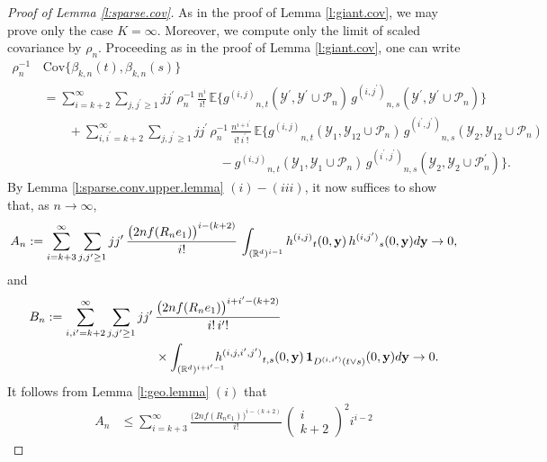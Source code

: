\documentclass[11pt]{amsart}
\numberwithin{equation}{section}
\theoremstyle{plain}
\theoremstyle{definition}
\begin{document}
\begin{proof}[Proof of Lemma \ref{l:sparse.cov}]
As in the proof of Lemma \ref{l:giant.cov}, we may prove only the case $K=\infty$. Moreover, we compute only the limit of scaled covariance by $\rho_n$. Proceeding as in the proof of Lemma \ref{l:giant.cov}, one can write
\begin{align*}
\rho_n^{-1}\, &\text{Cov} \bigl\{ \beta_{k,n}(t), \beta_{k,n}(s) \bigr\}  \\
&= \sum_{i=k+2}^\infty \sum_{j, {j^{\prime}} \geq 1} j {j^{\prime}}\, \rho_n^{-1}\, \frac{ n^i}{i!}\, {\mathbb{E}} \bigl\{ {g^{(i,j)}}_{n,t}({{\mathcal{Y}^{\prime}}}, {{\mathcal{Y}^{\prime}}} \cup {\mathcal P_n})\, {g^{(i,j^{\prime})}}_{n,s}({{\mathcal{Y}^{\prime}}}, {{\mathcal{Y}^{\prime}}} \cup {\mathcal P_n}) \bigr\} \\
&\qquad + \sum_{i, {i^{\prime}}=k+2}^\infty \sum_{j, {j^{\prime}} \geq 1} j {j^{\prime}}\, \rho_n^{-1}\, \frac{ n^{i+{i^{\prime}}}}{i!\, {i^{\prime}} !}\, {\mathbb{E}} \bigl\{  {g^{(i,j)}}_{n,t}({{\mathcal{Y}}}_1, {{\mathcal{Y}}}_{12} \cup {\mathcal P_n})\, {g^{(i^{\prime},j^{\prime})}}_{n,s}({{\mathcal{Y}}}_2, {{\mathcal{Y}}}_{12} \cup {\mathcal P_n})  \\
&\qquad \qquad \qquad \qquad \qquad \qquad \qquad  - {g^{(i,j)}}_{n,t}({{\mathcal{Y}}}_1, {{\mathcal{Y}}}_1 \cup {\mathcal P_n})\, {g^{(i^{\prime},j^{\prime})}}_{n,s} ({{\mathcal{Y}}}_2, {{\mathcal{Y}}}_2 \cup {\mathcal P_n^{\prime}}) \bigr\}.
\end{align*}
By Lemma \ref{l:sparse.conv.upper.lemma} $(i) - (iii)$, it now suffices to show that, as $n\to \infty$,
$$
A_n := \sum_{i=k+3}^\infty \sum_{j, {j^{\prime}} \geq 1} j {j^{\prime}}\, \frac{\bigl(  2nf(R_ne_1) \bigr)^{i-(k+2)}}{i!}\, \int_{({{\mathbb R}}^d)^{i-1}} {h^{(i,j)}}_t(0,{{\bf y}})\, {h^{(i,{j^{\prime}})}}_s(0,{{\bf y}}) d{{\bf y}} \to 0,
$$
and
\begin{align*}
B_n := \sum_{i, {i^{\prime}} =k+2}^\infty \sum_{j, {j^{\prime}} \geq 1} j {j^{\prime}}\, &\frac{\bigl(  2nf(R_ne_1) \bigr)^{i+{i^{\prime}}-(k+2)}}{i!\, {i^{\prime}} !}\, \\
&\times \int_{({{\mathbb R}}^d)^{i+{i^{\prime}}-1}} \hspace{-10pt} {h^{(i, j, i^{\prime}, j^{\prime})}}_{t,s} (0,{{\bf y}})\,{{\bf 1}}_{{D^{(i,{i^{\prime}})}}(t\vee s)}(0,{{\bf y}})d{{\bf y}}
\to 0.
\end{align*}
It follows from Lemma \ref{l:geo.lemma} $(i)$ that
\begin{align*}
A_n &\leq \sum_{i=k+3}^\infty \frac{\bigl(  2nf(R_ne_1) \bigr)^{i-(k+2)}}{i!}\, \begin{pmatrix} i \\k+2 \end{pmatrix}^2 i^{i-2}

\end{align*}
\end{proof}
\end{document}

